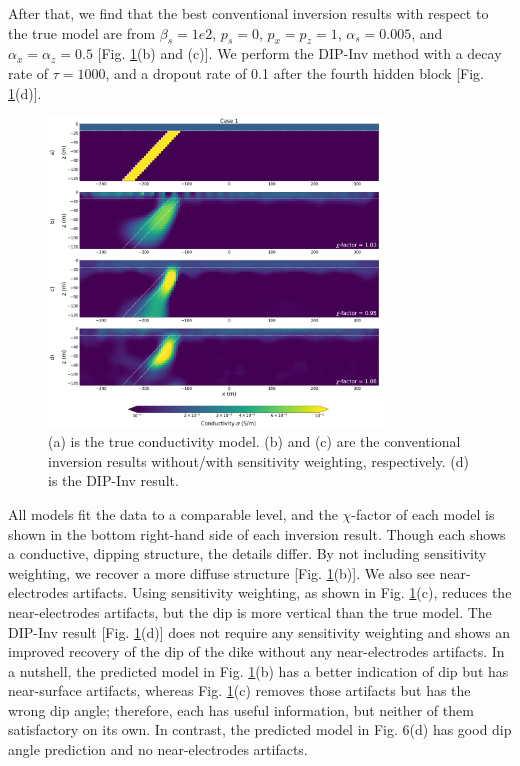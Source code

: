 \documentclass[lettersize,journal]{IEEEtran}
\begin{document}
After that, we find that the best conventional inversion results with respect to the true model are from $\beta_s = 1e2$, $p_s = 0$, $p_x = p_z = 1$, $\alpha_s = 0.005$, and $\alpha_x = \alpha_z = 0.5$ [Fig. \ref{fig3_3}(b) and (c)]. We perform the DIP-Inv method with a decay rate of $\tau = 1000$, and a dropout rate of 0.1 after the fourth hidden block [Fig. \ref{fig3_3}(d)].

\begin{figure}[h!]
\centering
\includegraphics[width=3.5in]{Figures/xu6.png}
\caption{(a) is the true conductivity model. (b) and (c) are the conventional inversion results without/with sensitivity weighting, respectively. (d) is the DIP-Inv result.}
\label{fig3_3}
\end{figure}

All models fit the data to a comparable level, and the $\chi$-factor of each model is shown in the bottom right-hand side of each inversion result. Though each shows a conductive, dipping structure, the details differ. By not including sensitivity weighting, we recover a more diffuse structure [Fig. \ref{fig3_3}(b)]. We also see near-electrodes artifacts. Using sensitivity weighting, as shown in Fig. \ref{fig3_3}(c), reduces the near-electrodes artifacts, but the dip is more vertical than the true model. The DIP-Inv result [Fig. \ref{fig3_3}(d)] does not require any sensitivity weighting and shows an improved recovery of the dip of the dike without any near-electrodes artifacts. In a nutshell, the predicted model in Fig. \ref{fig3_3}(b) has a better indication of dip but has near-surface artifacts, whereas Fig. \ref{fig3_3}(c) removes those artifacts but has the wrong dip angle; therefore, each has useful information, but neither of them satisfactory on its own. In contrast, the predicted model in Fig. 6(d) has good dip angle prediction and no near-electrodes artifacts.
\end{document}
